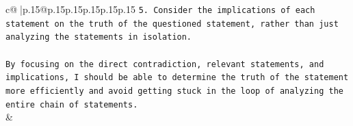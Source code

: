 \documentclass{article}
\begin{document}
{\begin{supertabular}{c@{$\;$}|p{.15\linewidth}@{}p{.15\linewidth}p{.15\linewidth}p{.15\linewidth}p{.15\linewidth}p{.15\linewidth}}
{{{\texttt{5. Consider the implications of each statement on the truth of the questioned statement, rather than just analyzing the statements in isolation.} \\
\\ 
\texttt{By focusing on the direct contradiction, relevant statements, and implications, I should be able to determine the truth of the statement more efficiently and avoid getting stuck in the loop of analyzing the entire chain of statements.} \\
            }
        }
    }
    & \\ \\

\end{supertabular}
}
\end{document}
